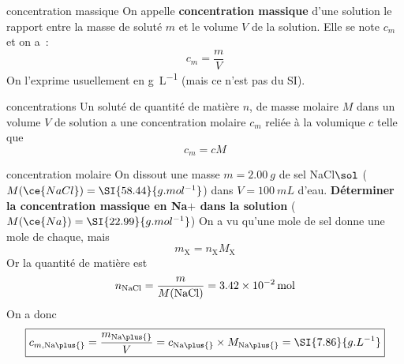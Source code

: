 \documentclass[../main/main.tex]{subfiles}
\begin{document}
\begin{tcbraster}[raster columns=2, raster equal height=rows]
    \begin{tcolorbox}[blankest, raster multicolumn=1]
        \begin{tcbraster}[raster columns=1]
            \begin{defi}[label=def:cmol]{concentration massique}
                On appelle \textbf{concentration massique} d'une solution le
                rapport entre la masse de soluté $m$ et le volume $V$ de
                la solution. Elle se note $c_m$ et on a~:
                \[\boxed{c_m = \frac{m}{V}}\]
                On l'exprime usuellement en \si{g.L^{-1}} (mais ce n'est pas du SI).
            \end{defi}
            \begin{prop}[label=prop:cvolmol]{concentrations}
                Un soluté de quantité de matière $n$, de masse molaire $M$ dans
                un volume $V$ de solution a une concentration molaire $c_m$
                reliée à la volumique $c$ telle que
                \[ \boxed{c_m = cM}\]
            \end{prop}
        \end{tcbraster}
    \end{tcolorbox}
    \begin{exem}[label=exem:cmol]{concentration molaire}
        On dissout une masse $m = \SI{2.00}{g}$ de sel NaCl$\sol$ ($M(\ce{NaCl})
        = \SI{58.44}{g.mol^{-1}}$) dans $V = \SI{100}{mL}$ d'eau.
        \textbf{Déterminer la concentration massique en Na$\plus{}$ dans la
        solution} ($M(\ce{Na}) = \SI{22.99}{g.mol^{-1}}$)
        \tcblower
        {\color{lightgray!10}On a vu qu'une mole de sel donne une mole de chaque, mais
        \[m_\mathrm{X} = n_\mathrm{X}M_\mathrm{X}\]
        Or la quantité de matière est
        \[n_{\rm NaCl} = \frac{m}{M({\rm NaCl})} = \SI{3.42e-2}{mol}\]
        On a donc
        \begin{equation*}
            \boxed{ c_{m,\rm Na\plus{}} = \frac{m_{\rm Na\plus{}}}{V} =
            c_{\rm Na\plus{}}\times M_{\rm Na\plus{}} = 
            \SI{7.86}{g.L^{-1}}}
        \end{equation*}
        }
    \end{exem}
\end{tcbraster}

\vspace{-20pt}
\end{document}
